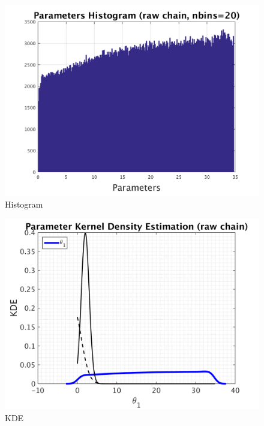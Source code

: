 \begin{figure}[h!]
  
  \centering
   \includegraphics[scale=0.75]{output_700000/simple_ip_hist_raw}
   \caption{Histogram}
\end{figure}



\begin{figure}[h!]
  
  \centering
   \includegraphics[scale=0.75]{output_700000/simple_ip_kde_raw}
   \caption{ KDE }
\end{figure}

